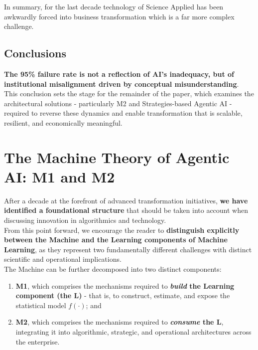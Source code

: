 \documentclass{article}
\begin{document}
In summary, for the last decade technology of Science Applied has been awkwardly forced into business transformation which is a far more complex challenge.\\


\subsection{Conclusions}
\label{subsection: Conclusions 4}
\textbf{The 95\% failure rate is not a reflection of AI’s inadequacy, but of institutional misalignment driven by conceptual misunderstanding}.\\

This conclusion sets the stage for the remainder of the paper, which examines the architectural solutions - particularly M2 and Strategies-based Agentic AI - required to reverse these dynamics and enable transformation that is scalable, resilient, and economically meaningful.\\


\section{The Machine Theory of Agentic AI: M1 and M2}
\label{section: The Machine Theory of Agentic AI: M1 and M2}

After a decade at the forefront of advanced transformation initiatives, \textbf{we have identified a foundational structure} that should be taken into account when discussing innovation in algorithmics and technology.\\

From this point forward, we encourage the reader to \textbf{distinguish explicitly between the Machine and the Learning components of Machine Learning}, as they represent two fundamentally different challenges with distinct scientific and operational implications.\\

The Machine can be further decomposed into two distinct components:
\begin{enumerate}
    \item \textbf{M1}, which comprises the mechanisms required to \textbf{\textit{build} the Learning component (the L)} - that is, to construct, estimate, and expose the statistical model \begin{math} f(·)\end{math}; and
    \item \textbf{M2}, which comprises the mechanisms required to \textbf{\textit{consume} the L}, integrating it into algorithmic, strategic, and operational architectures across the enterprise.
\end{enumerate}
\end{document}
